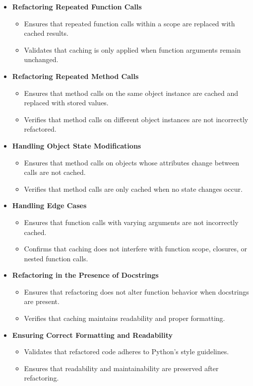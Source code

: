 \documentclass[12pt, titlepage]{article}
\begin{document}
\begin{itemize}
    \item \textbf{Refactoring Repeated Function Calls}
    \begin{itemize}
        \item Ensures that repeated function calls within a scope are replaced with cached results.
        \item Validates that caching is only applied when function arguments remain unchanged.
    \end{itemize}

    \item \textbf{Refactoring Repeated Method Calls}
    \begin{itemize}
        \item Ensures that method calls on the same object instance are cached and replaced with stored values.
        \item Verifies that method calls on different object instances are not incorrectly refactored.
    \end{itemize}

    \item \textbf{Handling Object State Modifications}
    \begin{itemize}
        \item Ensures that method calls on objects whose attributes change between calls are not cached.
        \item Verifies that method calls are only cached when no state changes occur.
    \end{itemize}

    \item \textbf{Handling Edge Cases}
    \begin{itemize}
        \item Ensures that function calls with varying arguments are not incorrectly cached.
        \item Confirms that caching does not interfere with function scope, closures, or nested function calls.
    \end{itemize}

    \item \textbf{Refactoring in the Presence of Docstrings}
    \begin{itemize}
        \item Ensures that refactoring does not alter function behavior when docstrings are present.
        \item Verifies that caching maintains readability and proper formatting.
    \end{itemize}

    \item \textbf{Ensuring Correct Formatting and Readability}
    \begin{itemize}
        \item Validates that refactored code adheres to Python’s style guidelines.
        \item Ensures that readability and maintainability are preserved after refactoring.
    \end{itemize}
\end{itemize}
\end{document}
